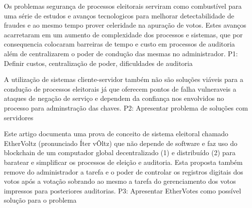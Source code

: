 \documentclass[
	article,			%
	11pt,				%
	oneside,			%
	a4paper,			%
	english,			%
	brazil,				%
	sumario=tradicional
	]{abntex2}
\begin{document}
\frenchspacing 



\maketitle

\begin{resumoumacoluna}
Os problemas segurança de processos eleitorais serviram como combustível para uma série de estudos e avanços tecnologicos para melhorar detectabilidade de fraudes e ao mesmo tempo prover celeridade na apuração de votos. Estes avanços acarretaram em um aumento de complexidade dos processos e sistemas, que por consequencia colocaram barreiras de tempo e custo em processos de auditoria além de centralizarem o poder de condução das mesmas no administrador. {P1: Definir custos, centralização de poder, dificuldades de auditoria}

A utilização de sistemas cliente-servidor também não são soluções viáveis para a condução de processos eleitorais já que oferecem pontos de falha vulneraveis a ataques de negação de serviço e dependem da confiança nos envolvidos no processo para adminstração das chaves. {P2: Apresentar problema de soluções com servidores}

Este artigo documenta uma prova de conceito de sistema eleitoral chamado EtherVoltz (pronunciado Íter vÔltz) que não depende de software e faz uso do blockchain de um computador global decentralizado (1) e distribuído (2) para baratear e simplificar os processos de eleição e auditoria. Esta proposta também remove do administrador a tarefa e o poder de controlar os registros digitais dos votos após a votação sobrando ao mesmo a tarefa do gerenciamento dos votos impressos para posteriores auditorias. {P3: Apresentar EtherVotes como possível solução para o problema} 

\end{resumoumacoluna}
\end{document}
